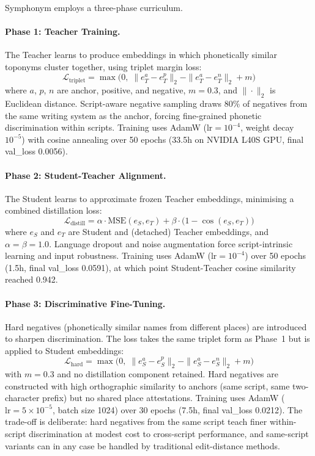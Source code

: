 \documentclass[11pt,a4paper]{article}
\begin{document}
Symphonym employs a three-phase curriculum.

\paragraph{Phase 1: Teacher Training.} The Teacher learns to produce embeddings in which phonetically similar toponyms cluster together, using triplet margin loss:
\begin{equation}
\mathcal{L}_{\text{triplet}} = \max\!\big(0,\; \|e_T^a - e_T^p\|_2 - \|e_T^a - e_T^n\|_2 + m\big)
\label{eq:phase1-loss}
\end{equation}
where $a$, $p$, $n$ are anchor, positive, and negative, $m = 0.3$, and $\|\cdot\|_2$ is Euclidean distance. Script-aware negative sampling draws 80\% of negatives from the same writing system as the anchor, forcing fine-grained phonetic discrimination within scripts. Training uses AdamW ($\text{lr} = 10^{-4}$, weight decay $10^{-5}$) with cosine annealing over 50 epochs (33.5h on NVIDIA L40S GPU, final val\_loss 0.0056).

\paragraph{Phase 2: Student-Teacher Alignment.} The Student learns to approximate frozen Teacher embeddings, minimising a combined distillation loss:
\begin{equation}
\mathcal{L}_{\text{distill}} = \alpha \cdot \text{MSE}(e_S, e_T) + \beta \cdot \big(1 - \cos(e_S, e_T)\big)
\label{eq:phase2-loss}
\end{equation}
where $e_S$ and $e_T$ are Student and (detached) Teacher embeddings, and $\alpha = \beta = 1.0$. Language dropout and noise augmentation force script-intrinsic learning and input robustness. Training uses AdamW ($\text{lr} = 10^{-4}$) over 50 epochs (1.5h, final val\_loss 0.0591), at which point Student-Teacher cosine similarity reached 0.942.

\paragraph{Phase 3: Discriminative Fine-Tuning.} Hard negatives (phonetically similar names from different places) are introduced to sharpen discrimination. The loss takes the same triplet form as Phase~1 but is applied to Student embeddings:
\begin{equation}
\mathcal{L}_{\text{hard}} = \max\!\big(0,\; \|e_S^a - e_S^p\|_2 - \|e_S^a - e_S^n\|_2 + m\big)
\label{eq:phase3-loss}
\end{equation}
with $m = 0.3$ and no distillation component retained. Hard negatives are constructed with high orthographic similarity to anchors (same script, same two-character prefix) but no shared place attestations. Training uses AdamW ($\text{lr} = 5 \times 10^{-5}$, batch size 1024) over 30 epochs (7.5h, final val\_loss 0.0212). The trade-off is deliberate: hard negatives from the same script teach finer within-script discrimination at modest cost to cross-script performance, and same-script variants can in any case be handled by traditional edit-distance methods.
\end{document}
